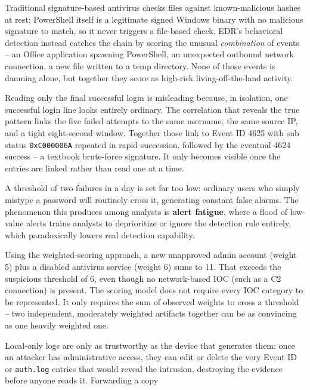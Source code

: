 \begin{answerkey}
\item Traditional signature-based antivirus checks files against known-malicious hashes at rest;
PowerShell itself is a legitimate signed Windows binary with no malicious signature to match, so it
never triggers a file-based check. EDR's behavioral detection instead catches the chain by scoring
the unusual \emph{combination} of events -- an Office application spawning PowerShell, an unexpected
outbound network connection, a new file written to a temp directory. None of those events is damning
alone, but together they score as high-risk living-off-the-land activity.
\item Reading only the final successful login is misleading because, in isolation, one successful
login line looks entirely ordinary. The correlation that reveals the true pattern links the five
failed attempts to the same username, the same source IP, and a tight eight-second window. Together
those link to Event ID 4625 with sub status \texttt{0xC000006A} repeated in rapid succession, followed
by the eventual 4624 success -- a textbook brute-force signature. It only becomes visible once the
entries are linked rather than read one at a time.
\item A threshold of two failures in a day is set far too low: ordinary users who simply mistype a
password will routinely cross it, generating constant false alarms. The phenomenon this produces
among analysts is \textbf{alert fatigue}, where a flood of low-value alerts trains analysts to
deprioritize or ignore the detection rule entirely, which paradoxically lowers real detection
capability.
\item Using the weighted-scoring approach, a new unapproved admin account (weight 5) plus a
disabled antivirus service (weight 6) sums to 11. That exceeds the suspicious threshold of 6, even
though no network-based IOC (such as a C2 connection) is present. The scoring model does not require
every IOC category to be represented. It only requires the sum of observed weights to cross a
threshold -- two independent, moderately weighted artifacts together can be as convincing as one
heavily weighted one.
\item Local-only logs are only as trustworthy as the device that generates them: once an attacker
has administrative access, they can edit or delete the very Event ID or \texttt{auth.log} entries
that would reveal the intrusion, destroying the evidence before anyone reads it. Forwarding a copy

\end{answerkey}
